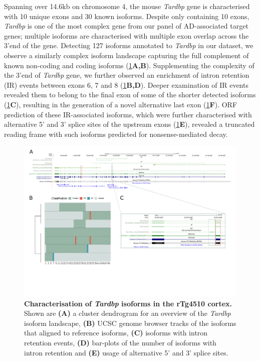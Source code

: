 Spanning over 14.6kb on chromosome 4, the mouse \textit{Tardbp} gene is characterised with 10 unique exons and 30 known isoforms. Despite only containing 10 exons, \textit{Tardbp} is one of the most complex gene from our panel of AD-associated target genes; multiple isoforms are characterised with multiple exon overlap across the 3'end of the gene. Detecting 127 isoforms annotated to \textit{Tardbp} in our dataset, we observe a similarly complex isoform landscape capturing the full complement of known non-coding and coding isoforms (\cref{fig:tardbp}\textbf{A,B}). Supplementing the complexity of the 3'end of \textit{Tardbp} gene, we further observed an enrichment of intron retention (IR) events between exons 6, 7 and 8 (\cref{fig:tardbp}\textbf{B,D}). Deeper examination of IR events revealed them to belong to the final exon of some of the shorter detected isoforms (\cref{fig:tardbp}\textbf{C}), resulting in the generation of a novel alternative last exon (\cref{fig:tardbp}\textbf{F}). ORF prediction of these IR-associated isoforms, which were further characterised with alternative 5' and 3' splice sites of the upstream exons (\cref{fig:tardbp}\textbf{E}), revealed a truncated reading frame with such isoforms predicted for nonsense-mediated decay. 


\begin{landscape}
	\begin{figure}[htp]
		\centering
		\captionsetup{width=1.3\textwidth}
		\includegraphics[page=11,trim={0 1cm 0 0},scale = 0.8]{Figures/TargetGenes_Annotation_Landscape.pdf}
		\caption[Characterisation of the \textit{Tardbp} isoform landscape]%
		{\textbf{Characterisation of \textit{Tardbp} isoforms in the rTg4510 cortex.} Shown are \textbf{(A)} a cluster dendrogram for an overview of the \textit{Tardbp} isoform landscape, \textbf{(B)} UCSC genome browser tracks of the isoforms that aligned to reference isoforms, \textbf{(C)} isoforms with intron retention events, \textbf{(D)} bar-plots of the number of isoforms with intron retention and \textbf{(E)} usage of alternative 5' and 3' splice sites.}    
		\label{fig:tardbp}
	\end{figure}
\end{landscape}
\restoregeometry

